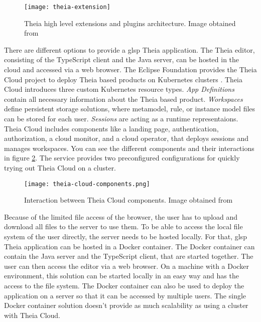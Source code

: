   \begin{figure}[h]
    \centering
    \texttt{[image: theia-extension]}
    \caption{Theia high level extensions and plugins architecture. Image obtained from \cite{theia-doc}}
    \label{fig:theia-extensions}
  \end{figure}

  There are different options to provide a \ac{glsp} Theia application. The Theia editor, consisting of the TypeScript client and the Java server, can be hosted in the cloud and accessed via a web browser. The Eclipse Foundation provides the Theia Cloud project \cite{theia-cloud-doc} to deploy Theia based products on Kubernetes clusters \cite{kubernetes}. Theia Cloud introduces three custom Kubernetes resource types. \textit{App Definitions} contain all necessary information about the Theia based product. \textit{Workspaces} define persistent storage solutions, where metamodel, rule, or instance model files can be stored for each user. \textit{Sessions} are acting as a runtime representaions. Theia Cloud includes components like a landing page, authentication, authorization, a cloud monitor, and a cloud operator, that deploys sessions and manages workspaces. You can see the different components and their interactions in figure \ref{fig:theia-cloud-components}. The service provides two preconfigured configurations for quickly trying out Theia Cloud on a cluster. \cite{theia-cloud-doc}

  \begin{figure}[h]
    \centering
    \texttt{[image: theia-cloud-components.png]}
    \caption{Interaction between Theia Cloud components. Image obtained from \cite{theia-cloud-doc}}
    \label{fig:theia-cloud-components}
  \end{figure}

  Because of the limited file access of the browser, the user has to upload and download all files to the server to use them. To be able to access the local file system of the user directly, the server needs to be hosted locally. For that, \ac{glsp} Theia application can be hosted in a Docker container. \cite{docker} The Docker container can contain the Java server and the TypeScript client, that are started together. The user can then access the editor via a web browser. On a machine with a Docker environment, this solution can be started locally in an easy way and has the access to the file system. The Docker container can also be used to deploy the application on a server so that it can be accessed by multiple users. The single Docker container solution doesn't provide as much scalability as using a cluster with Theia Cloud.

